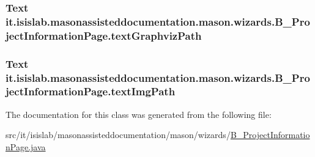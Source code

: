\hypertarget{classit_1_1isislab_1_1masonassisteddocumentation_1_1mason_1_1wizards_1_1_b___project_information_page_a03d43e1fbcdb5d7d5e6745d8f57db84b}{
\subsubsection[{text\-Graphviz\-Path}]{\setlength{\rightskip}{0pt plus 5cm}Text it.\-isislab.\-masonassisteddocumentation.\-mason.\-wizards.\-B\-\_\-\-Project\-Information\-Page.\-text\-Graphviz\-Path\hspace{0.3cm}{\ttfamily [private]}}}\label{classit_1_1isislab_1_1masonassisteddocumentation_1_1mason_1_1wizards_1_1_b___project_information_page_a03d43e1fbcdb5d7d5e6745d8f57db84b}
\hypertarget{classit_1_1isislab_1_1masonassisteddocumentation_1_1mason_1_1wizards_1_1_b___project_information_page_a1217897a98e0714c9e7d8141b4e931d1}{
\subsubsection[{text\-Img\-Path}]{\setlength{\rightskip}{0pt plus 5cm}Text it.\-isislab.\-masonassisteddocumentation.\-mason.\-wizards.\-B\-\_\-\-Project\-Information\-Page.\-text\-Img\-Path\hspace{0.3cm}{\ttfamily [private]}}}\label{classit_1_1isislab_1_1masonassisteddocumentation_1_1mason_1_1wizards_1_1_b___project_information_page_a1217897a98e0714c9e7d8141b4e931d1}


The documentation for this class was generated from the following file\-:\begin{DoxyCompactItemize}
\item 
src/it/isislab/masonassisteddocumentation/mason/wizards/\hyperlink{_b___project_information_page_8java}{B\-\_\-\-Project\-Information\-Page.\-java}\end{DoxyCompactItemize}
